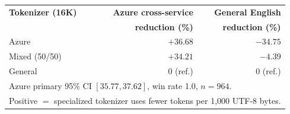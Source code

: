 
\begin{tabular}{lrr}
\toprule
\textbf{Tokenizer (16K)} & \textbf{Azure cross-service} & \textbf{General English} \\
 & \textbf{reduction (\%)} & \textbf{reduction (\%)} \\
\midrule
Azure & $+36.68$ & $-34.75$ \\
Mixed (50/50) & $+34.21$ & $-4.39$ \\
General & $0$ (ref.) & $0$ (ref.) \\
\midrule
\multicolumn{3}{l}{\footnotesize Azure primary 95\% CI $[35.77, 37.62]$, win rate 1.0, $n=964$.} \\
\multicolumn{3}{l}{\footnotesize Positive $=$ specialized tokenizer uses fewer tokens per 1{,}000 UTF-8 bytes.} \\
\bottomrule
\end{tabular}
